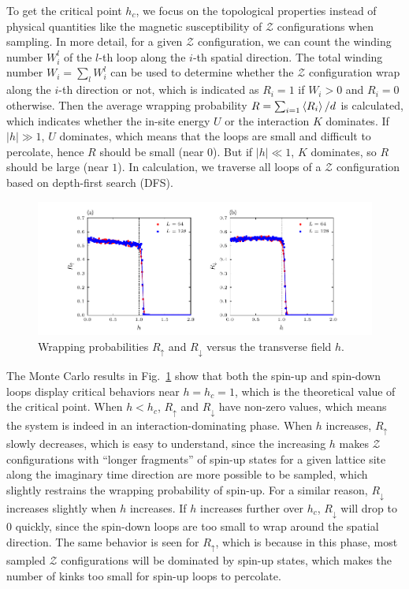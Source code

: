 \documentclass{article}
\theoremstyle{plain} \newtheorem{thm}{Theorem}[section]
\theoremstyle{definition} \newtheorem{df}{Definition}[section]
\theoremstyle{definition} \newtheorem{eg}{Example}
\theoremstyle{remark} \newtheorem*{rmk}{Remark}
\begin{document}
To get the critical point $h_c$, we focus on the topological properties instead of physical quantities like the magnetic susceptibility of $\mathcal{Z}$ configurations when sampling. In more detail, for a given $\mathcal{Z}$ configuration, we can count the winding number $W_i^l$ of the $l$-th loop along the $i$-th spatial direction. The total winding number $W_i = \sum_{l}W_i^l$ can be used to determine whether the $\mathcal{Z}$ configuration wrap along the $i$-th direction or not, which is indicated as $R_i = 1$ if $W_i > 0$ and $R_i = 0$ otherwise. Then the average wrapping probability $R = \sum_{i=1}\braket{R_i}/d$ is calculated, which indicates whether the in-site energy $U$ or the interaction $K$ dominates. If $|h| \gg 1$, $U$ dominates, which means that the loops are small and difficult to percolate, hence $R$ should be small (near $0$). But if $|h| \ll 1$, $K$ dominates, so $R$ should be large (near $1$). In calculation, we traverse all loops of a $\mathcal{Z}$ configuration based on depth-first search (DFS).

\begin{figure}[htpb]
  \centering
  \includegraphics[width=\textwidth]{figs/wrapping_probability.pdf}
  \caption{Wrapping probabilities $R_\uparrow$ and $R_\downarrow$ versus the transverse field $h$.}
  \label{fig:wrapping_probability}
\end{figure}

The Monte Carlo results in Fig.~\ref{fig:wrapping_probability} show that both the spin-up and spin-down loops display critical behaviors near $h = h_c = 1$, which is the theoretical value of the critical point. When $h < h_c$, $R_\uparrow$ and $R_\downarrow$ have non-zero values, which means the system is indeed in an interaction-dominating phase. When $h$ increases, $R_\uparrow$ slowly decreases, which is easy to understand, since the increasing $h$ makes $\mathcal{Z}$ configurations with ``longer fragments'' of spin-up states for a given lattice site along the imaginary time direction are more possible to be sampled, which slightly restrains the wrapping probability of spin-up. For a similar reason, $R_\downarrow$ increases slightly when $h$ increases. If $h$ increases further over $h_c$, $R_\downarrow$ will drop to $0$ quickly, since the spin-down loops are too small to wrap around the spatial direction. The same behavior is seen for $R_\uparrow$, which is because in this phase, most sampled $\mathcal{Z}$ configurations will be dominated by spin-up states, which makes the number of kinks too small for spin-up loops to percolate.
\end{document}
